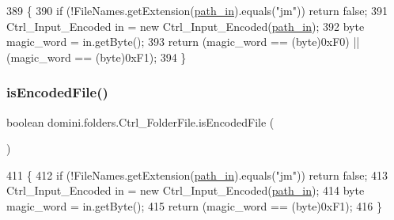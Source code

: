 \begin{DoxyCode}
389                                \{
390         \textcolor{keywordflow}{if} (!FileNames.getExtension(\hyperlink{classdomini_1_1folders_1_1Ctrl__FolderFile_a0d3946bb2832a1f34d0c2227df5c71c4}{path\_in}).equals(\textcolor{stringliteral}{"jm"})) \textcolor{keywordflow}{return} \textcolor{keyword}{false};
391         Ctrl\_Input\_Encoded in = \textcolor{keyword}{new} Ctrl\_Input\_Encoded(\hyperlink{classdomini_1_1folders_1_1Ctrl__FolderFile_a0d3946bb2832a1f34d0c2227df5c71c4}{path\_in});
392         byte magic\_word = in.getByte();
393         \textcolor{keywordflow}{return} (magic\_word == (byte)0xF0) || (magic\_word == (byte)0xF1);
394     \}
\end{DoxyCode}
\mbox{\label{classdomini_1_1folders_1_1Ctrl__FolderFile_a3198690e1ecc46e00431f35d87080d79}} 
\subsubsection{\texorpdfstring{is\+Encoded\+File()}{isEncodedFile()}}
{\footnotesize\ttfamily boolean domini.\+folders.\+Ctrl\+\_\+\+Folder\+File.\+is\+Encoded\+File (\begin{DoxyParamCaption}{ }\end{DoxyParamCaption})\hspace{0.3cm}{\ttfamily [inline]}}


\begin{DoxyCode}
411                                    \{
412         \textcolor{keywordflow}{if} (!FileNames.getExtension(\hyperlink{classdomini_1_1folders_1_1Ctrl__FolderFile_a0d3946bb2832a1f34d0c2227df5c71c4}{path\_in}).equals(\textcolor{stringliteral}{"jm"})) \textcolor{keywordflow}{return} \textcolor{keyword}{false};
413         Ctrl\_Input\_Encoded in = \textcolor{keyword}{new} Ctrl\_Input\_Encoded(\hyperlink{classdomini_1_1folders_1_1Ctrl__FolderFile_a0d3946bb2832a1f34d0c2227df5c71c4}{path\_in});
414         byte magic\_word = in.getByte();
415         \textcolor{keywordflow}{return} (magic\_word == (byte)0xF1);
416     \}
\end{DoxyCode}
\mbox{\label{classdomini_1_1folders_1_1Ctrl__FolderFile_a095e6037e5cdf9a43806a308ca028791}} 
